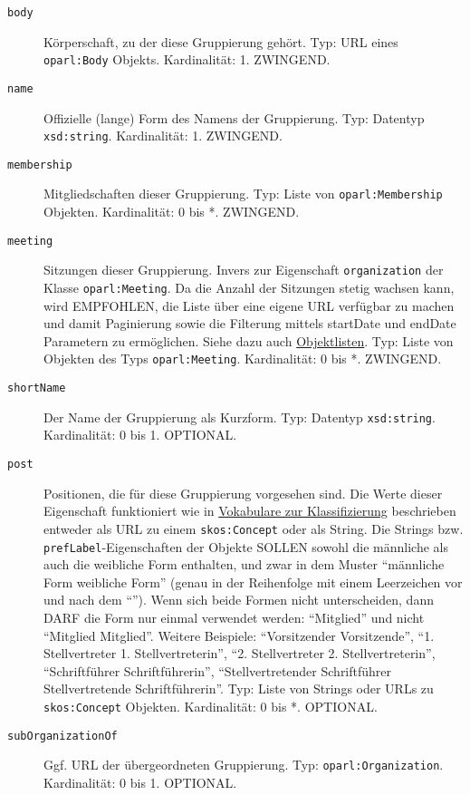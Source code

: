 \documentclass[,a4paper]{article}
\begin{document}
\begin{description}
\item[\texttt{body}]
Körperschaft, zu der diese Gruppierung gehört. Typ: URL eines
\texttt{oparl:Body} Objekts. Kardinalität: 1. ZWINGEND.
\item[\texttt{name}]
Offizielle (lange) Form des Namens der Gruppierung. Typ: Datentyp
\texttt{xsd:string}. Kardinalität: 1. ZWINGEND.
\item[\texttt{membership}]
Mitgliedschaften dieser Gruppierung. Typ: Liste von
\texttt{oparl:Membership} Objekten. Kardinalität: 0 bis *. ZWINGEND.
\item[\texttt{meeting}]
Sitzungen dieser Gruppierung. Invers zur Eigenschaft
\texttt{organization} der Klasse \texttt{oparl:Meeting}. Da die Anzahl
der Sitzungen stetig wachsen kann, wird EMPFOHLEN, die Liste über eine
eigene URL verfügbar zu machen und damit Paginierung sowie die Filterung
mittels startDate und endDate Parametern zu ermöglichen. Siehe dazu auch
\hyperref[objektlisten]{Objektlisten}. Typ: Liste von Objekten des Typs
\texttt{oparl:Meeting}. Kardinalität: 0 bis *. ZWINGEND.
\item[\texttt{shortName}]
Der Name der Gruppierung als Kurzform. Typ: Datentyp
\texttt{xsd:string}. Kardinalität: 0 bis 1. OPTIONAL.
\item[\texttt{post}]
Positionen, die für diese Gruppierung vorgesehen sind. Die Werte dieser
Eigenschaft funktioniert wie in
\hyperref[vokabulareux5fklassifizierung]{Vokabulare zur Klassifizierung}
beschrieben entweder als URL zu einem \texttt{skos:Concept} oder als
String. Die Strings bzw. \texttt{prefLabel}-Eigenschaften der Objekte
SOLLEN sowohl die männliche als auch die weibliche Form enthalten, und
zwar in dem Muster ``männliche Form \textbar{} weibliche Form'' (genau
in der Reihenfolge mit einem Leerzeichen vor und nach dem
``\textbar{}''). Wenn sich beide Formen nicht unterscheiden, dann DARF
die Form nur einmal verwendet werden: ``Mitglied'' und nicht ``Mitglied
\textbar{} Mitglied''. Weitere Beispiele: ``Vorsitzender \textbar{}
Vorsitzende'', ``1. Stellvertreter \textbar{} 1. Stellvertreterin'',
``2. Stellvertreter \textbar{} 2. Stellvertreterin'', ``Schriftführer
\textbar{} Schriftführerin'', ``Stellvertretender Schriftführer
\textbar{} Stellvertretende Schriftführerin''. Typ: Liste von Strings
oder URLs zu \texttt{skos:Concept} Objekten. Kardinalität: 0 bis *.
OPTIONAL.
\item[\texttt{subOrganizationOf}]
Ggf. URL der übergeordneten Gruppierung. Typ:
\texttt{oparl:Organization}. Kardinalität: 0 bis 1. OPTIONAL.

\end{description}
\end{document}
